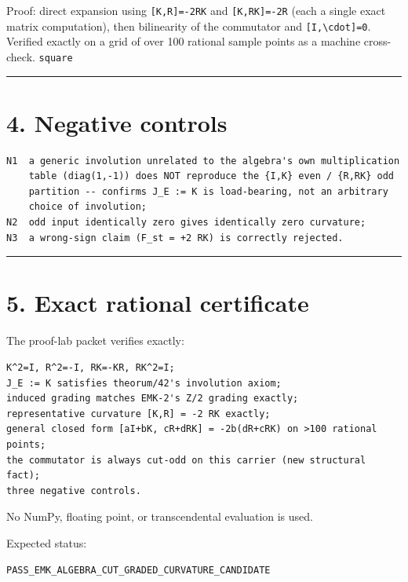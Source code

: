 Proof: direct expansion using \texttt{{[}K,R{]}=-2RK} and \texttt{{[}K,RK{]}=-2R} (each a single
exact matrix computation), then bilinearity of the commutator and
\texttt{{[}I,\textbackslash{}cdot{]}=0}. Verified exactly on a grid of over 100 rational sample
points as a machine cross-check. \texttt{square}

\begin{center}\rule{0.5\linewidth}{0.5pt}\end{center}

\hypertarget{negative-controls}{%
\section{4. Negative controls}\label{negative-controls}}

\begin{verbatim}
N1  a generic involution unrelated to the algebra's own multiplication
    table (diag(1,-1)) does NOT reproduce the {I,K} even / {R,RK} odd
    partition -- confirms J_E := K is load-bearing, not an arbitrary
    choice of involution;
N2  odd input identically zero gives identically zero curvature;
N3  a wrong-sign claim (F_st = +2 RK) is correctly rejected.
\end{verbatim}

\begin{center}\rule{0.5\linewidth}{0.5pt}\end{center}

\hypertarget{exact-rational-certificate}{%
\section{5. Exact rational certificate}\label{exact-rational-certificate}}

The proof-lab packet verifies exactly:

\begin{verbatim}
K^2=I, R^2=-I, RK=-KR, RK^2=I;
J_E := K satisfies theorum/42's involution axiom;
induced grading matches EMK-2's Z/2 grading exactly;
representative curvature [K,R] = -2 RK exactly;
general closed form [aI+bK, cR+dRK] = -2b(dR+cRK) on >100 rational points;
the commutator is always cut-odd on this carrier (new structural fact);
three negative controls.
\end{verbatim}

No NumPy, floating point, or transcendental evaluation is used.

Expected status:

\begin{verbatim}
PASS_EMK_ALGEBRA_CUT_GRADED_CURVATURE_CANDIDATE
\end{verbatim}

